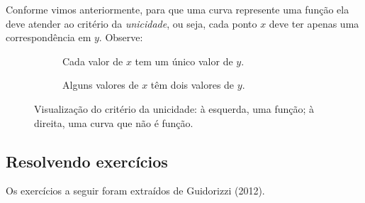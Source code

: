 \documentclass[12pt,openright,twoside,a4paper]{article}
\theoremstyle{definition}
\begin{document}
	Conforme vimos anteriormente, para que uma curva represente uma função ela deve atender ao critério da \textit{unicidade}, ou seja, cada ponto $x$ deve ter apenas uma correspondência em $y$. Observe:

		
		\begin{figure}[h!]
			\centering
			
			\begin{subfigure}[t]{0.45\textwidth}
				\centering
				\caption{Cada valor de $x$ tem um único valor de $y$.}
			\end{subfigure}
			\hfill
			\begin{subfigure}[t]{0.45\textwidth}
				\centering
				\caption{Alguns valores de $x$ têm dois valores de $y$.}
			\end{subfigure}
			
			\caption{Visualização do critério da unicidade: à esquerda, uma função; à direita, uma curva que não é função.}
			\label{fig:unicidade_dashed}
		\end{figure}

	
	
	\subsection{Resolvendo exercícios}
	Os exercícios a seguir foram extraídos de Guidorizzi (2012).
	
\end{document}

